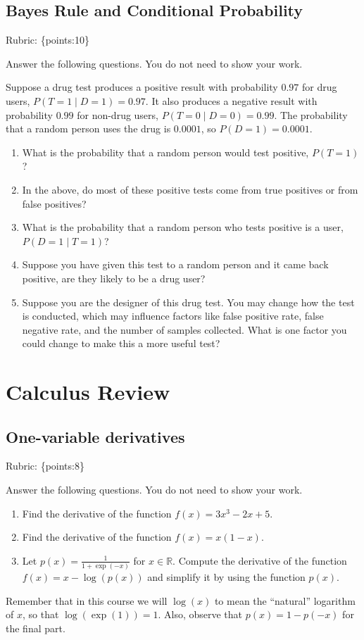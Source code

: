 \documentclass{article}
\def\rubric#1{\gre{Rubric: \{#1\}}}{}
\def\blu#1{{\color{blu}#1}}
\def\gre#1{{\color{gre}#1}}
\def\R{\mathbb{R}}
\begin{document}
	\subsection{Bayes Rule and Conditional Probability}
	\rubric{points:10}

	\blu{Answer the following questions.} You do not need to show your work.

	Suppose a drug test produces a positive result with probability $0.97$ for drug users, $P(T=1 \mid D=1)=0.97$. It also produces a negative result with probability $0.99$ for non-drug users, $P(T=0 \mid D=0)=0.99$. The probability that a random person uses the drug is $0.0001$, so $P(D=1)=0.0001$.

	\begin{enumerate}
		\item What is the probability that a random person would test positive, $P(T=1)$?
		\item In the above, do most of these positive tests come from true positives or from false positives?
		\item What is the probability that a random person who tests positive is a user, $P(D=1 \mid T=1)$?
		\item Suppose you have given this test to a random person and it came back positive, are they likely to be a drug user?
		\item Suppose you are the designer of this drug test. You may change how the test is conducted, which may influence factors like false positive rate, false negative rate, and the number of samples collected. What is one factor you could change to make this a more useful test?
	\end{enumerate}


	\section{Calculus Review}



	\subsection{One-variable derivatives}
	\label{sub.one.var}
	\rubric{points:8}

	\blu{Answer the following questions.} You do not need to show your work.

	\begin{enumerate}
		\item Find the derivative of the function $f(x) = 3x^3 -2x + 5$.
		\item Find the derivative of the function $f(x) = x(1-x)$.
		\item Let $p(x) = \frac{1}{1+\exp(-x)}$ for $x \in \R$. Compute the derivative of the function $f(x) = x-\log(p(x))$ and simplify it by using the function $p(x)$.
	\end{enumerate}
	Remember that in this course we will $\log(x)$ to mean the ``natural'' logarithm of $x$, so that $\log(\exp(1)) = 1$. Also, observe that $p(x) = 1-p(-x)$ for the final part.
\end{document}
